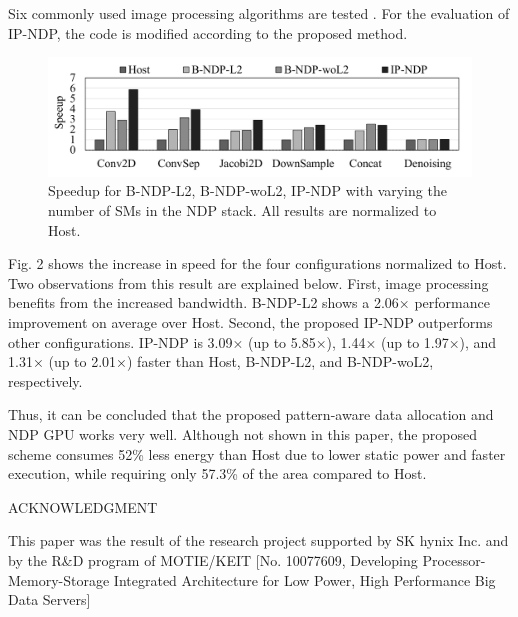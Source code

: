 \documentclass[onecolumn]{article}
\begin{document}
Six commonly used image processing algorithms are tested \cite{ref6, ref7}. For the evaluation of IP-NDP, the code is modified according to the proposed method.

\begin{figure}[H]
	\centering
	\includegraphics[width=\textwidth]{Figure-2.png}
	\caption{Speedup for B-NDP-L2, B-NDP-woL2, IP-NDP with varying the
		number of SMs in the NDP stack. All results are normalized to Host.}
	\label{fig:speedup_sms}
\end{figure}

Fig. 2 shows the increase in speed for the four configurations normalized to Host. Two observations from this result are explained below. First, image processing benefits from the increased bandwidth. B-NDP-L2 shows a 2.06× performance improvement on average over Host. Second, the proposed IP-NDP outperforms other configurations. IP-NDP is 3.09× (up to 5.85×), 1.44× (up to 1.97×), and 1.31× (up to 2.01×) faster than Host, B-NDP-L2, and B-NDP-woL2, respectively.

Thus, it can be concluded that the proposed pattern-aware data allocation and NDP GPU works very well. Although not shown in this paper, the proposed scheme consumes 52\% less energy than Host due to lower static power and faster execution, while requiring only 57.3\% of the area compared to Host.

\begin{center}
	ACKNOWLEDGMENT
\end{center}

This paper was the result of the research project supported by SK hynix Inc. and by the R\&D program of MOTIE/KEIT [No. 10077609, Developing Processor-Memory-Storage Integrated Architecture for Low Power, High Performance Big Data Servers]


 
\end{document}
